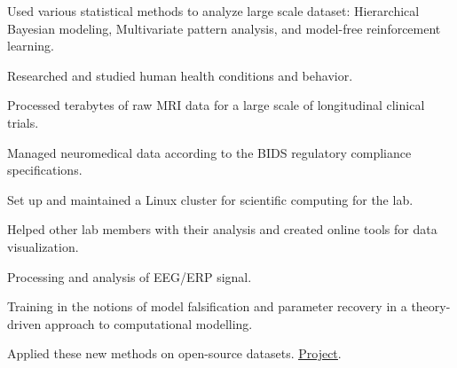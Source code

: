 \documentclass[]{plushcv}
\begin{document}
\begin{minipage}[t]{0.70\textwidth}
\sectionsep
{}
\begin{tightemize}
\item Used various statistical methods to analyze large
scale dataset: Hierarchical Bayesian modeling,
Multivariate pattern analysis, and model-free reinforcement
learning.
\item Researched and studied human health conditions
and behavior.
\item Processed terabytes of raw MRI data for a large scale of
longitudinal clinical trials.
\item Managed neuromedical data according to
the BIDS regulatory compliance specifications.
\item Set up and maintained a Linux cluster for
scientific computing for the lab.
\item Helped other lab members with their analysis and
created online tools for data visualization.
\end{tightemize}
\sectionsep


\sectionsep
{}
\begin{tightemize}
\item Processing and analysis of EEG/ERP signal.
\item Training in the notions of model falsification and
parameter recovery in a theory-driven approach to computational modelling. 
\item Applied these new methods on open-source datasets. \href{https://github.com/munoztd0/Computational-Modelling}{\underline{Project}}.
\end{tightemize}








\end{minipage}
\end{document}

